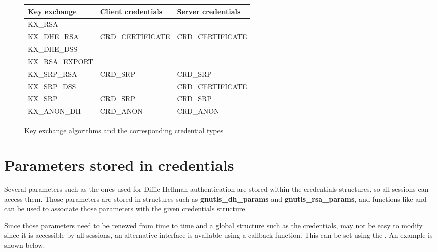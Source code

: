 \begin{figure}[hbtp]
\begin{tabular}{|l|l|p{4.5cm}|}

\hline
\bf{Key exchange} & \bf{Client credentials} & \bf{Server credentials}
\\
\hline
\hline
KX\_RSA &&
\\
\cline{1-1}
KX\_DHE\_RSA & CRD\_CERTIFICATE & CRD\_CERTIFICATE
\\
\cline{1-1}
KX\_DHE\_DSS &&
\\
\cline{1-1}
KX\_RSA\_EXPORT &&
\\
\hline
KX\_SRP\_RSA & CRD\_SRP & CRD\_SRP
\\
\cline{1-1}
KX\_SRP\_DSS && CRD\_CERTIFICATE
\\
\hline
KX\_SRP & CRD\_SRP & CRD\_SRP
\\
\hline
KX\_ANON\_DH & CRD\_ANON & CRD\_ANON
\\
\hline
\end{tabular}

\caption{Key exchange algorithms and the corresponding credential types}
\label{fig:kxcred}

\end{figure}



\section{Parameters stored in credentials}

Several parameters such as the ones used for Diffie-Hellman authentication
are stored within the credentials structures, so all sessions can access
them. Those parameters are stored in structures such as {\bf gnutls\_dh\_params}
and {\bf gnutls\_rsa\_params}, and functions like 
and
can be used to associate those parameters with the given credentials structure.
\par
Since those parameters need to be renewed from time to time and a 
global structure such as the credentials, may not be easy to modify
since it is accessible by all sessions, an alternative interface is
available using a callback function.
This can be set using the
.
An example is shown below.

